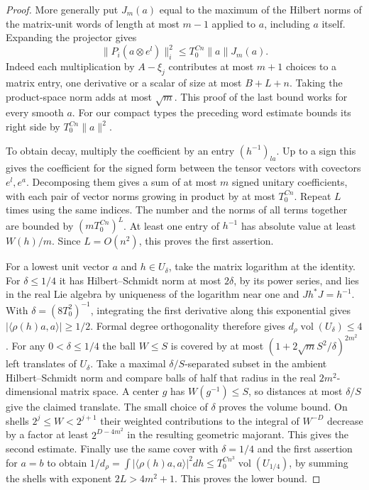 \documentclass[a4paper,11pt]{article}
\theoremstyle{definition}
\theoremstyle{remark}
\numberwithin{equation}{section}
\begin{document}
\begin{proof}
More generally put \(J_m(a)\) equal to the maximum of the Hilbert
norms of the matrix-unit words of length at most \(m-1\) applied to
\(a\), including \(a\) itself. Expanding the projector gives
\[
      \|P_i(a\otimes e^l)\|_i^2
                    \le T_0^{C n}\|a\|J_m(a).
\]
Indeed each multiplication by \(A-\xi_j\) contributes at most
\(m+1\) choices to a matrix entry, one derivative or a scalar of size
at most \(B+L+n\). Taking the product-space norm adds at most
\(\sqrt m\). This proof of the last bound works for every smooth
\(a\). For our compact types the preceding word estimate bounds
its right side by \(T_0^{C n}\|a\|^2\).

To obtain decay, multiply the coefficient by an entry
\((h^{-1})_{la}\). Up to a sign this gives the coefficient for the
signed form between the tensor vectors with covectors \(e^l,e^a\).
Decomposing them gives a sum of at most \(m\) signed unitary
coefficients, with each pair of vector norms growing in product by
at most \(T_0^{C n}\). Repeat \(L\) times using the same indices.
The number and the norms of all terms together are bounded by
\((m T_0^{C n})^L\). At least one entry of \(h^{-1}\) has absolute
value at least \(W(h)/m\). Since \(L=O(n^2)\), this proves the first
assertion.

For a lowest unit vector \(a\) and \(h\in U_\delta\), take the
matrix logarithm at the identity. For \(\delta\le1/4\) it has
Hilbert--Schmidt norm at most \(2\delta\), by its power series, and
lies in the real Lie algebra by uniqueness of the logarithm near one
and \(Jh^*J=h^{-1}\). With \(\delta=(8T_0^2)^{-1}\), integrating
the first derivative along this exponential gives
\(|\langle\rho(h)a,a\rangle|\ge1/2\). Formal degree orthogonality
therefore gives \(d_\rho\operatorname{vol}(U_\delta)\le4\).
For any \(0<\delta\le1/4\) the ball \(W\le S\) is covered by at most
\((1+2\sqrt m S^2/\delta)^{2m^2}\) left translates of \(U_\delta\).
Take a maximal \(\delta/S\)-separated subset in the ambient
Hilbert--Schmidt norm and compare balls of half that radius in the
real \(2m^2\)-dimensional matrix space. A center \(g\) has
\(W(g^{-1})\le S\), so distances at most \(\delta/S\) give the claimed
translate. The small choice of \(\delta\) proves the volume bound.
On shells \(2^j\le W<2^{j+1}\) their weighted contributions to the
integral of \(W^{-D}\) decrease by a factor at least \(2^{D-4m^2}\)
in the resulting geometric majorant. This gives the second estimate.
Finally use the same cover with \(\delta=1/4\) and the first assertion
for \(a=b\) to obtain
\(1/d_\rho=\int |\langle\rho(h)a,a\rangle|^2 dh
 \le T_0^{C n^3}\operatorname{vol}(U_{1/4})\), by summing the shells
with exponent \(2L>4m^2+1\). This proves the lower bound.
\end{proof}
\end{document}
